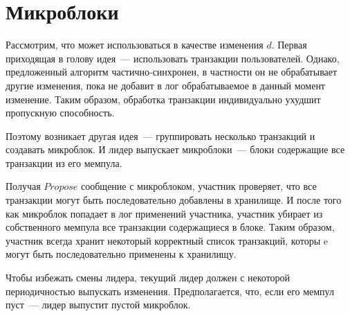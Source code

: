 \section{Микроблоки}
Рассмотрим, что может использоваться в качестве изменения $d$. Первая приходящая в голову идея~--- использовать транзакции пользователей. Однако, предложенный алгоритм частично-синхронен, в частности он не обрабатывает другие изменения, пока не добавит в лог обрабатываемое в данный момент изменение. Таким образом, обработка транзакции индивидуально ухудшит пропускную способность.

Поэтому возникает другая идея~--- группировать несколько транзакций и создавать микроблок. И лидер выпускает микроблоки~--- блоки содержащие все транзакции из его мемпула. 

Получая $Propose$ сообщение с микроблоком, участник проверяет, что все транзакции могут быть последовательно добавлены в хранилище.
И после того как микроблок попадает в лог применений участника, участник убирает из собственного мемпула все транзакции содержащиеся в блоке. Таким образом, участник всегда хранит некоторый корректный список транзакций, которы	e могут быть последовательно применены к хранилищу.

Чтобы избежать смены лидера, текущий лидер должен с некоторой периодичностью выпускать изменения. Предполагается, что, если его мемпул пуст~--- лидер выпустит пустой микроблок.

